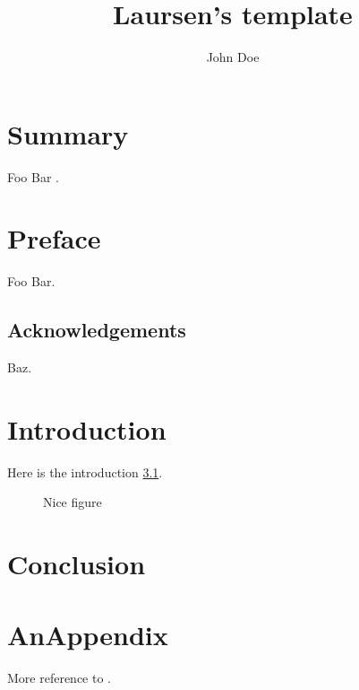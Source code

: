 \documentclass[a4paper,twoside,watermark,extrafontsizes,confidential]{laursenthesis}
\title      {Laursen's template}
\author     {John Doe}
\begin{document}
\prefrontmatter
\maketitle
\makecolophon


\frontmatter
\chapter{Summary}
Foo Bar \cite{adams1980hitchhiker}.
\chapter{Preface}
Foo Bar.
\section{Acknowledgements}
Baz.
\clearforchapter
\tableofcontents
\mylistoftodos


\mainmatter
\chapter{Introduction}
Here is the introduction \cref{myNiceFigure}.

\begin{figure}
  \caption{Nice figure}\label{myNiceFigure}
\end{figure}

\chapter{Conclusion}


\appendix
\chapter{AnAppendix}
More reference to \cite{rfc2549}.


\backmatter


\end{document}
